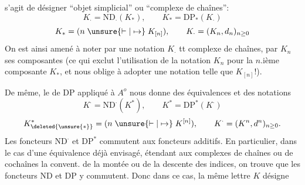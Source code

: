 s'agit de désigner  ``objet simplicial'' ou ``complexe de chaînes'':
\[
 K_{\cdot}=\mathrm{ND}_{\cdot}(K_*),\qquad K_*=\mathrm{DP}_*(K_{\cdot})
\]
\[
 K_*=(n\mathrel{\unsure{\vdash|\mapsto}}K_{[n]}),\qquad
 K_{\cdot}=(K_n,d_n)_{n\geq0}
\]
On est ainsi amené à noter par une notation $K_{\cdot}$ tt complexe de chaînes,
par $K_n$ ses composantes (ce qui exclut l'utilisation de la notation $K_n$
pour la $n$.ième composante  $K_*$, et nous oblige à adopter
une notation telle que $K_{[n]}$!).

De même, le  de $\mathrm{DP}$ appliqué à $A^o$ nous donne des équivalences
et des notations
\[
 K^{\cdot}=\mathrm{ND}^{\cdot}(K^*),\qquad K^*=\mathrm{DP}^*(K^{\cdot})
\]
\[
 K^{*}_{\deleted{\unsure{*}}}=(n\mathrel{\unsure{\vdash|\mapsto}}K^{[n]}),\qquad
 K^{\cdot}=(K^n,d^n)_{n\geq0}.
\]
Les foncteurs $\mathrm{ND}^{\cdot}$ et $\mathrm{DP}^*$ commutent aux foncteurs additifs.
En particulier, dans le cas d'une équivalence
déjà envisagé, étendant aux complexes de chaînes ou de cochaînes la convent.
de la montée ou de la descente des indices, on trouve que les foncteurs
$\mathrm{ND}$ et $\mathrm{DP}$ y commutent. Donc dans ce cas, la même lettre $K$ désigne
